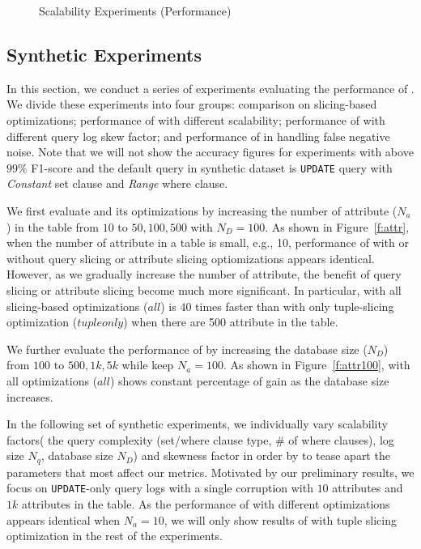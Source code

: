 \begin{figure}[h]
    \caption{Scalability Experiments (Performance)}
  \end{figure}
\fi

\subsection{Synthetic Experiments}
\label{sec:experiments:synth}
In this section, we conduct a series of experiments evaluating the performance of \sys. 
We divide these experiments into four groups: comparison on slicing-based optimizations;  
performance of \sys with different scalability; performance of \sys with different
query log skew factor; and performance of \sys in handling false negative noise. 
Note that we will not show the accuracy figures for experiments with above $99\%$
F1-score and the default query in synthetic dataset is 
\texttt{UPDATE} query with \textit{Constant} set clause and
\textit{Range} where clause.

We first evaluate \sys and its optimizations by increasing the number of attribute ($N_a$)
in the table from $10$ to $50, 100, 500$ with $N_D = 100$. As shown 
in Figure~\ref{f:attr}, when the number of attribute in a table is small, e.g., 10, 
performance of \sys with or without query slicing or attribute slicing optiomizations 
appears identical. However, as we gradually increase the number of attribute, the benefit
of query slicing or attribute slicing become much more significant. 
In particular, \sys with all slicing-based optimizations ($all$) is $40$ times faster than \sys with only tuple-slicing 
optimization ($tuple only$) when there are 500 attribute in the table.  

We further evaluate the performance of \sys by increasing the database size ($N_D$) from
$100$ to $500, 1k, 5k$ while keep $N_a = 100$. As shown in Figure~\ref{f:attr100}, \sys with all optimizations 
($all$) shows constant percentage of gain as the database size increases. 

\smallskip

In the following set of synthetic experiments, we individually vary scalability factors(
the query complexity (set/where clause type, \# of where clauses), log size $N_q$, database size $N_D$) and skewness 
factor in 
order by to tease apart the parameters that most affect our metrics.
Motivated by our preliminary results, we focus on \texttt{UPDATE}-only query logs with a single corruption with
$10$ attributes and $1k$ attributes in the table. As the performance of \sys with different optimizations appears 
identical when $N_a = 10$, we will only show results of \sys with tuple slicing optimization in the rest of the 
experiments. 


